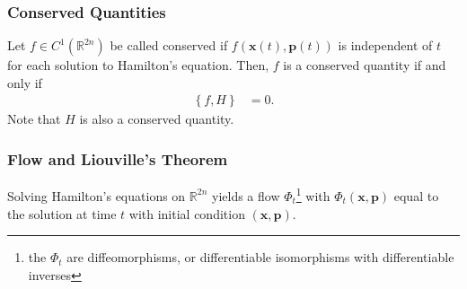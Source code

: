 \documentclass[10pt]{extarticle}
\newcommand{\R}{\mathbb{R}}
\newcommand{\set}[1]{\left\{#1\right\}}
\theoremstyle{plain}
\theoremstyle{definition}
\theoremstyle{remark}
\renewcommand{\newline}{\hfill\break}
\begin{document}
  \subsubsection{Conserved Quantities}%
  Let $f\in C^{1}(\R^{2n})$ be called conserved if $f(\mathbf{x}(t),\mathbf{p}(t))$ is independent of $t$ for each solution to Hamilton's equation. Then, $f$ is a conserved quantity if and only if
  \begin{align*}
    \set{f,H} &= 0.
  \end{align*}
  Note that $H$ is also a conserved quantity.
  \subsubsection{Flow and Liouville's Theorem}%
  Solving Hamilton's equations on $\R^{2n}$ yields a flow $\Phi_t$\footnote{the $\Phi_t$ are diffeomorphisms, or differentiable isomorphisms with differentiable inverses} with $\Phi_t(\mathbf{x},\mathbf{p})$ equal to the solution at time $t$ with initial condition $(\mathbf{x},\mathbf{p})$.\newline
\end{document}
